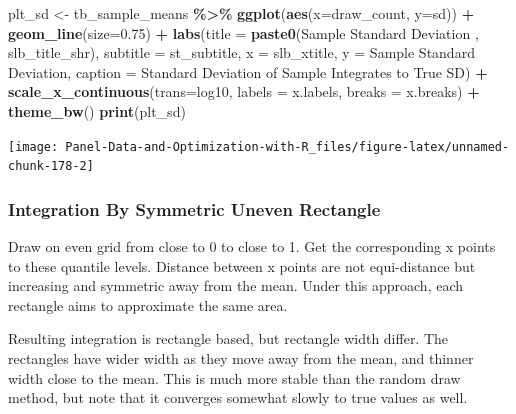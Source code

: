 \documentclass[
]{book}
\newenvironment{Shaded}{\begin{snugshade}}{\end{snugshade}}
\newcommand{\DataTypeTok}[1]{\textcolor[rgb]{0.13,0.29,0.53}{#1}}
\newcommand{\FloatTok}[1]{\textcolor[rgb]{0.00,0.00,0.81}{#1}}
\newcommand{\KeywordTok}[1]{\textcolor[rgb]{0.13,0.29,0.53}{\textbf{#1}}}
\newcommand{\NormalTok}[1]{#1}
\newcommand{\OperatorTok}[1]{\textcolor[rgb]{0.81,0.36,0.00}{\textbf{#1}}}
\newcommand{\StringTok}[1]{\textcolor[rgb]{0.31,0.60,0.02}{#1}}
\begin{document}
\begin{Shaded}
\begin{Highlighting}[]
\NormalTok{plt\_sd \textless{}{-}}\StringTok{ }\NormalTok{tb\_sample\_means }\OperatorTok{\%\textgreater{}\%}
\StringTok{  }\KeywordTok{ggplot}\NormalTok{(}\KeywordTok{aes}\NormalTok{(}\DataTypeTok{x=}\NormalTok{draw\_count, }\DataTypeTok{y=}\NormalTok{sd)) }\OperatorTok{+}
\StringTok{  }\KeywordTok{geom\_line}\NormalTok{(}\DataTypeTok{size=}\FloatTok{0.75}\NormalTok{) }\OperatorTok{+}
\StringTok{  }\KeywordTok{labs}\NormalTok{(}\DataTypeTok{title =} \KeywordTok{paste0}\NormalTok{(}\StringTok{\textquotesingle{}Sample Standard Deviation \textquotesingle{}}\NormalTok{, slb\_title\_shr),}
       \DataTypeTok{subtitle =}\NormalTok{ st\_subtitle,}
       \DataTypeTok{x =}\NormalTok{ slb\_xtitle,}
       \DataTypeTok{y =} \StringTok{\textquotesingle{}Sample Standard Deviation\textquotesingle{}}\NormalTok{,}
       \DataTypeTok{caption =} \StringTok{\textquotesingle{}Standard Deviation of Sample Integrates to True SD\textquotesingle{}}\NormalTok{) }\OperatorTok{+}
\StringTok{  }\KeywordTok{scale\_x\_continuous}\NormalTok{(}\DataTypeTok{trans=}\StringTok{\textquotesingle{}log10\textquotesingle{}}\NormalTok{, }\DataTypeTok{labels =}\NormalTok{ x.labels, }\DataTypeTok{breaks =}\NormalTok{ x.breaks) }\OperatorTok{+}
\StringTok{  }\KeywordTok{theme\_bw}\NormalTok{()}
\KeywordTok{print}\NormalTok{(plt\_sd)}
\end{Highlighting}
\end{Shaded}

\begin{center}\texttt{[image: Panel-Data-and-Optimization-with-R\_files/figure-latex/unnamed-chunk-178-2]} \end{center}

\hypertarget{integration-by-symmetric-uneven-rectangle}{%
\subsubsection{Integration By Symmetric Uneven Rectangle}\label{integration-by-symmetric-uneven-rectangle}}

Draw on even grid from close to 0 to close to 1. Get the corresponding x points to these quantile levels. Distance between x points are not equi-distance but increasing and symmetric away from the mean. Under this approach, each rectangle aims to approximate the same area.

Resulting integration is rectangle based, but rectangle width differ. The rectangles have wider width as they move away from the mean, and thinner width close to the mean. This is much more stable than the random draw method, but note that it converges somewhat slowly to true values as well.
\end{document}

